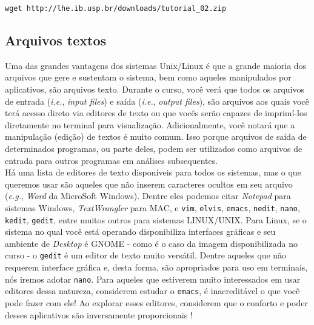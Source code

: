\begin{center}
\small \texttt{wget http://lhe.ib.usp.br/downloads/tutorial\_02.zip}\\
\end{center}

\newpage
\pagestyle{fancy} %
\begin{refsection}
\renewcommand*{\finalnamedelim}{\addspace\&\space}%

\section{Arquivos textos}\label{tut2:text}
	Uma das grandes vantagens dos sistemas Unix/Linux é que a grande maioria dos arquivos que gere e sustentam o sistema, bem como aqueles manipulados por aplicativos, são arquivos texto. Durante o curso, você verá que todos os arquivos de entrada (\textit{i.e.}, \textit{input files}) e saída (\textit{i.e.}, \textit{output files}), são arquivos aos quais você terá acesso direto via editores de texto ou que vocês serão capazes de imprimí-los diretamente no terminal para visualização. Adicionalmente, você notará que a manipulação (edição) de textos é muito comum. Isso porque arquivos de saída de determinados programas, ou parte deles, podem ser utilizados como arquivos de entrada para outros programas em análises subsequentes.\\

	Há uma lista de editores de texto disponíveis para todos os sistemas, mas o que queremos usar são aqueles que não inserem caracteres ocultos em seu arquivo (\textit{e.g.}, \textit{Word} da MicroSoft Windows). Dentre eles podemos citar \textit{Notepad} para sistemas Windows, \textit{TextWrangler} para MAC, e \texttt{vim}, \texttt{elvis}, \texttt{emacs}, \texttt{nedit}, \texttt{nano}, \texttt{kedit}, \texttt{gedit}, entre muitos outros para sistemas LINUX/UNIX. Para Linux, se o sistema no qual você está operando disponibiliza interfaces gráficas e seu ambiente de \textit{Desktop} é GNOME - como é o caso da imagem disponibilizada no curso - o \texttt{gedit} é um editor de texto muito versátil. Dentre aqueles que não requerem interface gráfica e, desta forma, são apropriados para uso em terminais, nós iremos adotar \texttt{nano}. Para aqueles que estiverem muito interessados em usar editores dessa natureza, considerem estudar o \texttt{emacs}, é inacreditável o que você pode fazer com ele! Ao explorar esses 
editores, considerem que o conforto e poder desses aplicativos são inversamente proporcionais \parencite [] [] {Wunchiers_2004,}!\\


\end{refsection}
